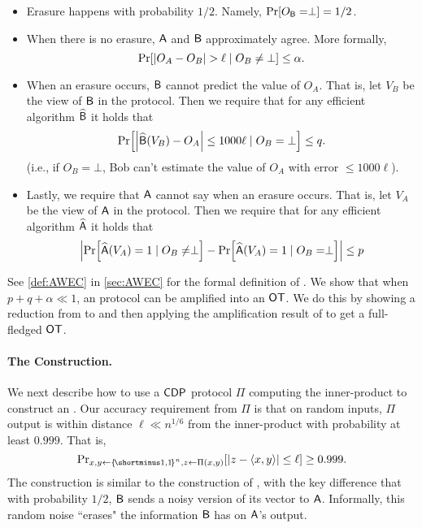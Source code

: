 \begin{itemize}
		
		\item Erasure happens with probability $1/2$. Namely,   $\pr{O_\Bc = \perp} = 1/2$.
		
		\item When there is no erasure, $\mathsf{A}$ and $\mathsf{B}$ approximately agree. More formally, $$\pr{\size{O_A - O_B} > \ell \mid O_B \ne \bot}\le \alpha.$$
		
		\item When an erasure occurs, $\mathsf{B}$ cannot predict the value of $O_A$. That is, let $V_B$ be the view of $\mathsf{B}$ in the protocol. Then we require that for any efficient algorithm  
		$\widehat{\mathsf{B}}$ it holds that
        \begin{align*}
				\pr{\size{\widehat{\Bc}(V_B) - O_A} \leq 1000 \ell \mid O_B=\bot} \leq q.
			\end{align*}
			(i.e., if $O_B=\bot$, Bob can't estimate the value of $O_A$ with error $\leq 1000 \ell$).
	
        \item Lastly, we require that $\mathsf{A}$ cannot say when an erasure occurs. That is, let $V_A$ be the view of $\mathsf{A}$ in the protocol.  Then we require that for any efficient algorithm  
		$\widehat{\mathsf{A}}$ it holds that
			\begin{align*}
				\size{\pr{\widehat{\Ac}(V_A) = 1 \mid O_B \neq \perp} - \pr{\widehat{\Ac}(V_A) = 1 \mid O_B = \perp}} \le p
			\end{align*}
	\end{itemize}
  See \cref{def:AWEC} in \cref{sec:AWEC} for the formal definition of \AWEC.  
  We show that when $p+q+\alpha \ll 1$, an \AWEC protocol can be amplified into an ${\sf OT}$. We do this by showing a reduction from \AWEC to \WEC and then applying the amplification result of \cite{Wullschleger09} to get a full-fledged ${\sf OT}$.

\paragraph{The Construction.} We next describe how to use a ${\sf CDP}$ protocol $\Pi$ computing the inner-product to construct an \AWEC. Our accuracy requirement from $\Pi$ is that on random inputs, $\Pi$ output is within distance $\ell \ll n^{1/6}$ from the inner-product with probability at least $0.999$. That is,
\[ 
\ppr{x,y\gets\oo^n,
z\gets \Pi(x,y)}{ \size{z-\langle x,y\rangle}\le \ell} \ge 0.999.
\]
The construction is similar to the construction of \cite{HaitnerMST22}, with the key difference that with probability $1/2$, $\mathsf{B}$ sends a noisy version of its vector to $\mathsf{A}$. Informally, this random noise ``erases" the information $\mathsf{B}$ has on $\mathsf{A}$'s output.



